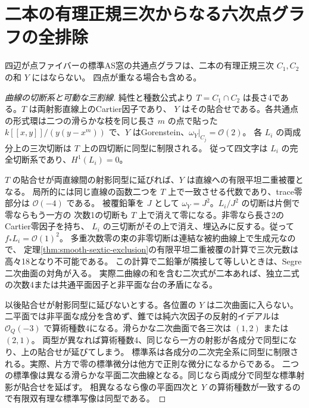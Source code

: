 \section{二本の有理正規三次からなる六次点グラフの全排除}
\label{sec:binary-sextic-exclusion}
\begin{theorem}\label{thm:binary-sextic-exclusion}
四辺が点ファイバーの標準AS窓の共通点グラフは、二本の有理正規三次 $C_1,C_2$ の和 $Y$ にはならない。
四点が重なる場合も含める。
\end{theorem}
\begin{proof}[曲線の切断系と可動な三割線]
純性と種数公式より $T=C_1\cap C_2$ は長さ4である。$T$ は両射影直線上のCartier因子であり、
$Y$ はその貼合せである。各共通点の形式環は二つの滑らかな枝を同じ長さ $m$ の点で貼った
$k[[x,y]]/(y(y-x^m))$ で、$Y$ はGorenstein、$\omega_Y|_{C_j}=\mathcal O(2)$。
各 $L_i$ の両成分上の三次切断は $T$ 上の四切断に同型に制限される。
従って四文字は $L_i$ の完全切断系であり、$H^1(L_i)=0$。

$T$ の貼合せが両直線間の射影同型に延びれば、$Y$ は直線への有限平坦二重被覆となる。
局所的には同じ直線の函数二つを $T$ 上で一致させる代数であり、trace零部分は $\mathcal O(-4)$ である。
被覆鉛筆を $J$ として $\omega_Y=J^2$。$L_i/J^2$ の切断は片側で零ならもう一方の
次数1の切断も $T$ 上で消えて零になる。非零なら長さ2のCartier零因子を持ち、
$L_i$ の三切断がその上で消え、埋込みに反する。従って $f_*L_i=\mathcal O(1)^2$。
多重次数零の束の非零切断は連結な被約曲線上で生成元なので、
定理\ref{thm:smooth-sextic-exclusion}の有限平坦二重被覆の計算で三次元数は高々18となり不可能である。
この計算で二鉛筆が隣接して等しいときは、Segre二次曲面の対角が入る。
実際二曲線の和を含む二次式が二本あれば、独立二式の次数4または共通平面因子と非平面な台の矛盾になる。

以後貼合せが射影同型に延びないとする。各位置の $Y$ は二次曲面に入らない。
二平面では非平面な成分を含めず、錐では純六次因子の反射的イデアルは
$\mathcal O_Q(-3)$ で算術種数4になる。滑らかな二次曲面で各三次は $(1,2)$ または $(2,1)$。
両型が異なれば算術種数4、同じなら一方の射影が各成分で同型になり、上の貼合せが延びてしまう。
標準系は各成分の二次完全系に同型に制限される。実際、片方で零の標準微分は他方で正則な微分になるからである。
二つの標準像は異なる滑らかな平面二次曲線となる。同じなら両成分で同型な標準射影が貼合せを延ばす。
相異なるなら像の平面四次と $Y$ の算術種数が一致するので有限双有理な標準写像は同型である。


\end{proof}
